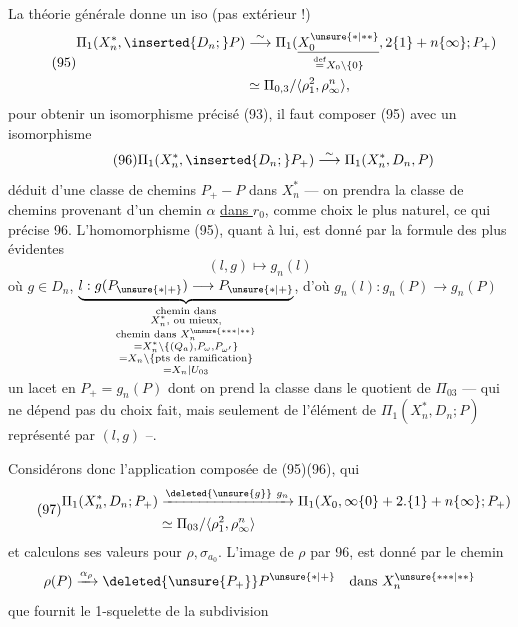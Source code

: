 La théorie générale donne un iso (pas extérieur !)
\[
\tag{95}
\begin{aligned}
\Pi_1(X_n^*,\inserted{D_n;}P)
&\overset\sim\longrightarrow
\Pi_1(\underset{\overset{\mathrm{def}}=X_0\setminus\{0\}}{\underline{X_0^{\unsure{*|**}}}},2\{1\}+n\{\infty\};P_+)\\
&\simeq\Pi_{0,3}/\langle\rho_1^2,\rho_\infty^n\rangle,
\end{aligned}
\]
pour obtenir un isomorphisme précisé (93), il faut composer (95) avec un isomorphisme
\[
\tag{96}
\Pi_1(X_n^*,\inserted{D_n;}P_+)\overset\sim\longrightarrow
\Pi_1(X_n^*,D_n,P)
\]
déduit d'une classe de chemins $P_+\mathbin{-}P$ dans $X_n^*$ — on prendra la  classe de chemins provenant d'un chemin $\alpha$ \uline{dans $r_0$}, comme choix le plus naturel, ce qui précise 96. L'homomorphisme (95), quant à lui, est donné par la formule des plus évidentes
\[
(l,g)\longmapsto g_n(l)
\]
où $g\in D_n$, $\underbrace{l:g(P_{\unsure{*|+}})\longrightarrow P_{\unsure{*|+}}}_{\substack{\text{chemin dans}\\X_n^*,\text{ ou mieux,}\\\text{chemin dans }X_n^{\unsure{***|**}}\\
=X_n^*\setminus\{(Q_a),P_\omega,P_{\omega'}\}\\
=X_n\setminus\{\text{pts de ramification}\}\\
=X_n\mid U_{03}}}$,
d'où $g_n(l):g_n(P)\longrightarrow g_n(P)$ un lacet en $P_+=g_n(P)$ dont on prend la classe dans le quotient de $\Pi_{03}$ — qui ne dépend pas du choix fait, mais seulement de l'élément de $\Pi_1(X_n^*,D_n;P)$ représenté par $(l,g)$ --.

Considérons donc l'application composée de (95)(96), qui  
\[
\tag{97}
\begin{aligned}
\Pi_1(X_n^*,D_n;P_+)&\xrightarrow{\deleted{\unsure{g}}\ g_n}
\Pi_1(X_0,\infty\{0\}+2.\{1\}+n\{\infty\};P_+)\\
&\simeq\Pi_{03}/\langle\rho_1^2,\rho_\infty^n\rangle
\end{aligned}
\]
et calculons ses valeurs pour $\rho,\sigma_{a_0}$. L'image de $\rho$ par 96, est donné par le chemin
\[
\rho(P)\xrightarrow{\alpha_\rho}\deleted{\unsure{P_+}}P^{\unsure{*|+}}
\quad\text{dans }X_n^{\unsure{***|**}}
\]
que fournit le 1-squelette de la subdivision



